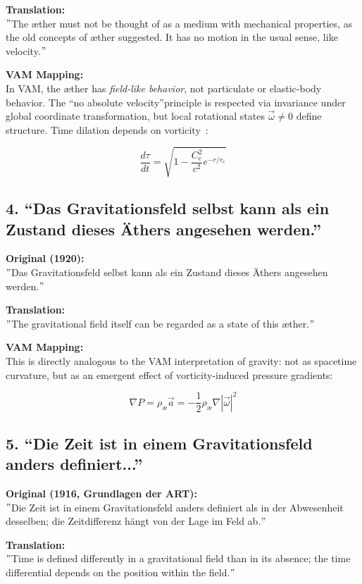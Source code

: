 \documentclass[preprint,notitlepage]{revtex4-2}
\renewcommand{\grqq}{``}
\begin{document}
    \textbf{Translation:} \\
    \("\)The æther must not be thought of as a medium with mechanical properties, as the old concepts of æther suggested. It has no motion in the usual sense, like velocity.\("\)

    \textbf{VAM Mapping:} \\
    In VAM, the æther has \emph{field-like behavior}, not particulate or elastic-body behavior. The \grqq no absolute velocity\textquotedblright principle is respected via invariance under global coordinate transformation, but local rotational states \( \vec{\omega} \neq 0 \) define structure. Time dilation depends on vorticity~\cite{VAM-2}:

    \[
    \frac{d\tau}{dt} = \sqrt{1 - \frac{C_e^2}{c^2} e^{-r/r_c}}
    \]

    \subsection*{4. \grqq Das Gravitationsfeld selbst kann als ein Zustand dieses Äthers angesehen werden.\textquotedblright}
    \textbf{Original (1920):} \\
    \("\)Das Gravitationsfeld selbst kann als ein Zustand dieses Äthers angesehen werden.\("\)

    \textbf{Translation:} \\
    \("\)The gravitational field itself can be regarded as a state of this æther.\("\)

    \textbf{VAM Mapping:} \\
    This is directly analogous to the VAM interpretation of gravity: not as spacetime curvature, but as an emergent effect of vorticity-induced pressure gradients:

    \[
    \nabla P = \rho_\text{\ae} \vec{a} = -\frac{1}{2} \rho_\text{\ae} \nabla |\vec{\omega}|^2
    \]

    \subsection*{5. \grqq Die Zeit ist in einem Gravitationsfeld anders definiert...\textquotedblright}
    \textbf{Original (1916, Grundlagen der ART):} \\
    \("\)Die Zeit ist in einem Gravitationsfeld anders definiert als in der Abwesenheit desselben; die Zeitdifferenz hängt von der Lage im Feld ab.\("\)

    \textbf{Translation:} \\
    \("\)Time is defined differently in a gravitational field than in its absence; the time differential depends on the position within the field.\("\)
\end{document}
